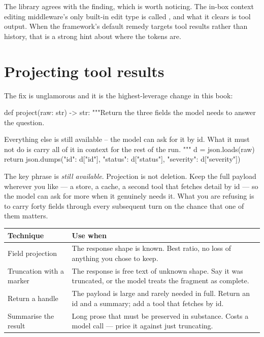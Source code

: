 \begin{note}
The library agrees with the finding, which is worth noticing. The in-box context
editing middleware's only built-in edit type is called ,
and what it clears is tool output. When the framework's default remedy targets
tool results rather than history, that is a strong hint about where the tokens
are.
\end{note}

\section{Projecting tool results}
\label{sec:projection}

The fix is unglamorous and it is the highest-leverage change in this book:

\begin{python}[caption={Return what the model needs, not what the API sent}, label={lst:projection}]
def project(raw: str) -> str:
    """Return the three fields the model needs to answer the question.

    Everything else is still available -- the model can ask for it by id. What
    it must not do is carry all of it in context for the rest of the run.
    """
    d = json.loads(raw)
    return json.dumps({"id": d["id"], "status": d["status"],
                       "severity": d["severity"]})
\end{python}

The key phrase is \emph{still available}. Projection is not deletion. Keep the
full payload wherever you like --- a store, a cache, a second tool that fetches
detail by id --- so the model can ask for more when it genuinely needs it. What
you are refusing is to carry forty fields through every subsequent turn on the
chance that one of them matters.

\begin{center}
\small
\begin{tabularx}{\linewidth}{@{}lX@{}}
\toprule
\textbf{Technique} & \textbf{Use when} \\
\midrule
Field projection & The response shape is known. Best ratio, no loss of anything
  you chose to keep. \\[3pt]
Truncation with a marker & The response is free text of unknown shape. Say it was
  truncated, or the model treats the fragment as complete. \\[3pt]
Return a handle & The payload is large and rarely needed in full. Return an id
  and a summary; add a tool that fetches by id. \\[3pt]
Summarise the result & Long prose that must be preserved in substance. Costs a
  model call --- price it against just truncating. \\
\bottomrule
\end{tabularx}
\end{center}

